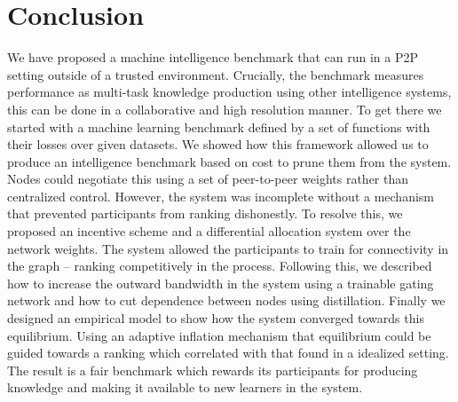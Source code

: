 \documentclass{article}
\begin{document}
\section{Conclusion}
\label{conclusion}
We have proposed a machine intelligence benchmark that can run in a P2P setting outside of a trusted environment. Crucially, the benchmark measures performance as multi-task knowledge production using other intelligence systems, this can be done in a collaborative and high resolution manner. To get there we started with a machine learning benchmark defined by a set of functions with their losses over given datasets. We showed how this framework allowed us to produce an intelligence benchmark based on cost to prune them from the system. Nodes could negotiate this using a set of peer-to-peer weights rather than centralized control. However, the system was incomplete without a mechanism that prevented participants from ranking dishonestly. To resolve this, we proposed an incentive scheme and a differential allocation system over the network weights. The system allowed the participants to train for connectivity in the graph -- ranking competitively in the process. Following this, we described how to increase the outward bandwidth in the system using a trainable gating network and how to cut dependence between nodes using distillation. Finally we designed an empirical model to show how the system converged towards this equilibrium. Using an adaptive inflation mechanism that equilibrium could be guided towards a ranking which correlated with that found in a idealized setting. The result is a fair benchmark which rewards its participants for producing knowledge and making it available to new learners in the system.

\end{document}
